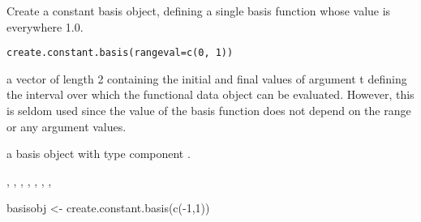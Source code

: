 \begin{Description}\relax
Create a constant basis object, defining a single basis function
whose value is everywhere 1.0.
\end{Description}
\begin{Usage}
\begin{verbatim}
create.constant.basis(rangeval=c(0, 1))
\end{verbatim}
\end{Usage}
\begin{Arguments}
\begin{ldescription}
\item[\code{rangeval}] a vector of length 2 containing the initial and final
values of argument t defining the interval over which the functional
data object can be evaluated.  However, this is seldom used 
since the value of the basis function does not depend on the range
or any argument values.

\end{ldescription}
\end{Arguments}
\begin{Value}
a basis object with type component .
\end{Value}
\begin{SeeAlso}\relax
{}, 
, 
, 
, 
, 
, 
, 
\end{SeeAlso}
\begin{Examples}
\begin{ExampleCode}

basisobj <- create.constant.basis(c(-1,1))

\end{ExampleCode}
\end{Examples}

